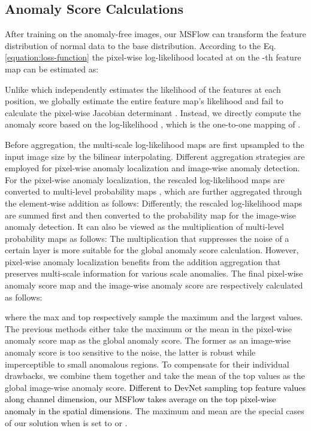 \documentclass[lettersize,journal]{IEEEtran}
\newcommand{\rounda}[1]{\textcolor{black}{#1}}
\begin{document}
\subsection{Anomaly Score Calculations} \label{sec:aggregation}
After training on the anomaly-free images, our MSFlow can transform the feature distribution of normal data to the base distribution. According to the Eq. \ref{equation:loss-function} the pixel-wise log-likelihood  located at  on the -th feature map  can be estimated as:

Unlike \cite{gudovskiy2022cflow} which independently estimates the likelihood of the features  at each position, we globally estimate the entire feature map's likelihood and fail to calculate the pixel-wise Jacobian determinant . Instead, we directly compute the anomaly score based on the log-likelihood , which is the one-to-one mapping of .

Before aggregation, the multi-scale log-likelihood maps are first upsampled to the input image size  by the bilinear interpolating. Different aggregation strategies are employed for pixel-wise anomaly localization and image-wise anomaly detection. For the pixel-wise anomaly localization, the rescaled log-likelihood maps  are converted to multi-level probability maps , which are further aggregated through the element-wise addition as follows:
\rounda{
}
Differently, the rescaled log-likelihood maps  are summed first and then converted to the probability map  for the image-wise anomaly detection. It can also be viewed as the multiplication of multi-level probability maps  as follows:
\rounda{
}
The multiplication that suppresses the noise of a certain layer is more suitable for the global anomaly score calculation. However, pixel-wise anomaly localization benefits from the addition aggregation that preserves multi-scale information for various scale anomalies.
The final pixel-wise anomaly score map  and the image-wise anomaly score  are respectively calculated as follows:

where the max and top respectively sample the maximum and the largest  values.
The previous methods either take the maximum \cite{gudovskiy2022cflow, zavrtanik2021riad} or the mean \cite{rudolph2022csflow,rudolph2021differnet} in the pixel-wise anomaly score map as the global anomaly score. The former as an image-wise anomaly score is too sensitive to the noise, the latter is robust while imperceptible to small anomalous regions. 
To compensate for their individual drawbacks, we combine them together and take the mean of the top values as the global image-wise anomaly score.
\rounda{
Different to DevNet \cite{pang2019devnet} sampling top feature values along channel dimension, our MSFlow takes average on the top pixel-wise anomaly in the spatial dimensions.}
The maximum and mean are the special cases of our solution when  is set to  or .
\end{document}
